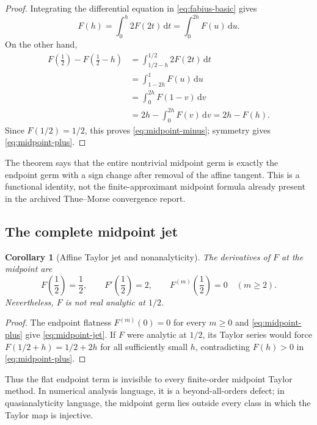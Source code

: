 \documentclass[11pt,oneside]{article}
\newtheorem{corollary}[theorem]{Corollary}
\theoremstyle{definition}
\theoremstyle{remark}
\newcommand{\dd}{\,\mathrm d}
\begin{document}
\begin{proof}
Integrating the differential equation in \eqref{eq:fabius-basic} gives
\begin{equation}
 F(h)=\int_0^h2F(2t)\dd t=\int_0^{2h}F(u)\dd u.
 \label{eq:F-integral}
\end{equation}
On the other hand,
\begin{align*}
 F\!\left(\frac12\right)-F\!\left(\frac12-h\right)
 &=\int_{1/2-h}^{1/2}2F(2t)\dd t\\
 &=\int_{1-2h}^{1}F(u)\dd u\\
 &=\int_0^{2h}F(1-v)\dd v\\
 &=2h-\int_0^{2h}F(v)\dd v
 =2h-F(h).
\end{align*}
Since $F(1/2)=1/2$, this proves \eqref{eq:midpoint-minus}; symmetry gives \eqref{eq:midpoint-plus}.
\end{proof}

\begin{corpusdeductionbox}
The theorem says that the entire nontrivial midpoint germ is exactly the endpoint germ with a sign change after removal of the affine tangent.  This is a functional identity, not the finite-approximant midpoint formula already present in the archived Thue--Morse convergence report.
\end{corpusdeductionbox}

\subsection{The complete midpoint jet}
\begin{corollary}[Affine Taylor jet and nonanalyticity]
\label{cor:midpoint-jet}
The derivatives of $F$ at the midpoint are
\begin{equation}
 F\!\left(\frac12\right)=\frac12,
 \qquad F'\!\left(\frac12\right)=2,
 \qquad F^{(m)}\!\left(\frac12\right)=0\quad(m\ge2).
 \label{eq:midpoint-jet}
\end{equation}
Nevertheless, $F$ is not real analytic at $1/2$.
\end{corollary}

\begin{proof}
The endpoint flatness $F^{(m)}(0)=0$ for every $m\ge0$ and \eqref{eq:midpoint-plus} give \eqref{eq:midpoint-jet}.  If $F$ were analytic at $1/2$, its Taylor series would force
$F(1/2+h)=1/2+2h$ for all sufficiently small $h$, contradicting $F(h)>0$ in \eqref{eq:midpoint-plus}.
\end{proof}

Thus the flat endpoint term is invisible to every finite-order midpoint Taylor method.  In numerical analysis language, it is a beyond-all-orders defect; in quasianalyticity language, the midpoint germ lies outside every class in which the Taylor map is injective.
\end{document}
